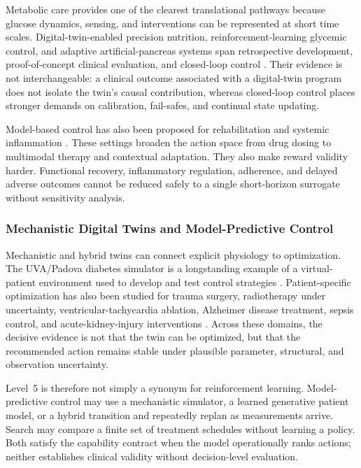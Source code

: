 Metabolic care provides one of the clearest translational pathways because glucose dynamics, sensing, and interventions can be represented at short time scales. Digital-twin-enabled precision nutrition, reinforcement-learning glycemic control, and adaptive artificial-pancreas systems span retrospective development, proof-of-concept clinical evaluation, and closed-loop control \citep{Shamanna2021Type2Diabetes,Wang2023Optimizedglycemiccontrol,Kovatchev2025InteractiveArtificialPancreas}. Their evidence is not interchangeable: a clinical outcome associated with a digital-twin program does not isolate the twin's causal contribution, whereas closed-loop control places stronger demands on calibration, fail-safes, and continual state updating.

Model-based control has also been proposed for rehabilitation and systemic inflammation \citep{Larie2022PreparingnextCOVID,Ye2025TowardsAIbased}. These settings broaden the action space from drug dosing to multimodal therapy and contextual adaptation. They also make reward validity harder. Functional recovery, inflammatory regulation, adherence, and delayed adverse outcomes cannot be reduced safely to a single short-horizon surrogate without sensitivity analysis.

\subsubsection{Mechanistic Digital Twins and Model-Predictive Control}

Mechanistic and hybrid twins can connect explicit physiology to optimization. The UVA/Padova diabetes simulator is a longstanding example of a virtual-patient environment used to develop and test control strategies \citep{Man2014UvaPadovaType}. Patient-specific optimization has also been studied for trauma surgery, radiotherapy under uncertainty, ventricular-tachycardia ablation, Alzheimer disease treatment, sepsis control, and acute-kidney-injury interventions \citep{Aubert2021DevelopmentDigitalTwins,Chaudhuri2023Predictivedigitaltwin,Chrispin2026DigitalTwinGuided,Xu2026NeuralOperatorBased,Pickard2026EhrMpcInference,Zhang2026WorldModelEnhanced}. Across these domains, the decisive evidence is not that the twin can be optimized, but that the recommended action remains stable under plausible parameter, structural, and observation uncertainty.

Level~5 is therefore not simply a synonym for reinforcement learning. Model-predictive control may use a mechanistic simulator, a learned generative patient model, or a hybrid transition and repeatedly replan as measurements arrive. Search may compare a finite set of treatment schedules without learning a policy. Both satisfy the capability contract when the model operationally ranks actions; neither establishes clinical validity without decision-level evaluation.


